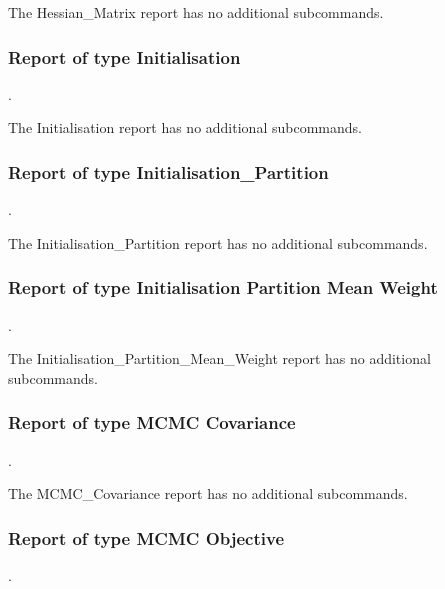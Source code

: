 The Hessian\_Matrix report has no additional subcommands.

\subsubsection{Report of type Initialisation}
.
\label{syntax:Report-Initialisation}

The Initialisation report has no additional subcommands.

\subsubsection{Report of type Initialisation\_Partition}
.
\label{syntax:Report-InitialisationPartition}

The Initialisation\_Partition report has no additional subcommands.

\subsubsection{Report of type Initialisation Partition Mean Weight}
.
\label{syntax:Report-InitialisationPartitionMeanWeight}

The Initialisation\_Partition\_Mean\_Weight report has no additional subcommands.

\subsubsection{Report of type MCMC Covariance}
.
\label{syntax:Report-MCMCCovariance}\\

The MCMC\_Covariance report has no additional subcommands.  

\subsubsection{Report of type MCMC Objective}
.
\label{syntax:Report-MCMCObjective}

